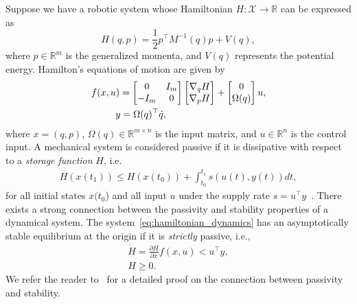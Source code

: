 Suppose we have a robotic system whose Hamiltonian $H : \mathcal{X} \rightarrow
\mathbb{R}$ can be expressed as
%
\begin{equation}
    H(q,p) = \frac{1}{2} p^\top M^{-1}(q) p + V(q),
    \label{eq:system_hamiltonian}
\end{equation}
%
where $p \in \mathbb{R}^m$ is the generalized momenta, and $V(q)$ represents the
potential energy. Hamilton's equations of motion are given by
\begin{align}
    \begin{split}  
      f(x, u) &= \bmat{0 & I_m \\ -I_m & 0}\bmat{\nabla_qH \\ \nabla_pH} + \bmat{0 \\ \Omega(q)}u, \\
      &\hspace{-0.15cm} y = \Omega(q)^\top \dot{q},
    \end{split}
    \label{eq:hamiltonian_dynamics}
\end{align}
\noindent where $x = (q, p)$, $\Omega(q) \in \mathbb{R}^{m \times n}$ is
the input matrix, and $u \in \mathbb{R}^{n}$ is the control input.
%
%
%
A mechanical system is considered passive if it is dissipative with respect to a
\textit{storage function} $H$, i.e.
\begin{align}
  H(x(t_1)) \leq H(x(t_0)) + \int_{t_0}^{t_1} s(u(t), y(t)) dt,
\end{align}
\noindent for all initial states $x(t_0$) and all input $u$ under the
supply rate $s = u^\top y$~\cite{van2000l2}.
There exists a strong connection between the passivity and stability properties
of a dynamical system.
%
The system~\eqref{eq:hamiltonian_dynamics} has an asymptotically stable equilibrium at the
origin if it is \textit{strictly} passive, i.e.,
\begin{equation*}
  \begin{gathered}
    \dot{H} = \frac{\partial H}{\partial x} f(x,u) < u^\top y, \\
    H \geq 0.
  \end{gathered}
\end{equation*}
%
We refer the reader to~\cite{khalil2015nonlinear} for a detailed proof on the
connection between passivity and stability.

